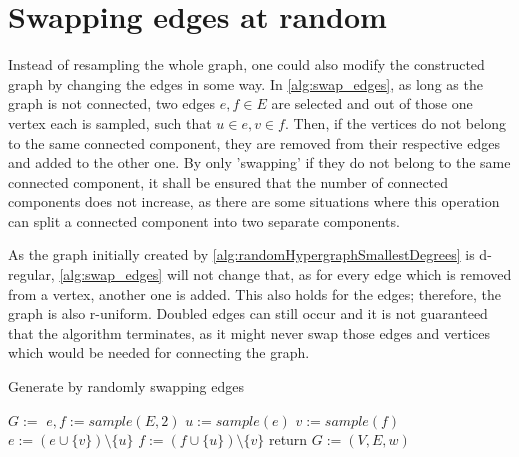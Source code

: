 \section{Swapping edges at random}
Instead of resampling the whole graph, one could also modify the constructed graph by changing the edges in some way. In \cref{alg:swap_edges}, as long as the graph is not connected, two edges $e,f \in E$ are selected and out of those one vertex each is sampled, such that $u\in e, v\in f$. Then, if the vertices do not belong to the same connected component, they are removed from their respective edges and added to the other one. By only 'swapping' if they do not belong to the same connected component, it shall be ensured that the number of connected components does not increase, as there are some situations where this operation can split a connected component into two separate components.

As the graph initially created by \cref{alg:randomHypergraphSmallestDegrees} is d-regular, \cref{alg:swap_edges} will not change that, as for every edge which is removed from a vertex, another one is added. This also holds for the edges; therefore, the graph is also r-uniform. Doubled edges can still occur and it is not guaranteed that the algorithm terminates, as it might never swap those edges and vertices which would be needed for connecting the graph.





	
\begin{algorithm}%
		\caption{Generate by randomly swapping edges \label{alg:swap_edges}} 
		\begin{algorithmic}
			\State $G:=$ 
			\State $e,f := sample(E, 2)$
			\State $u := sample(e)$
			\State $v := sample(f)$
			\State $e := (e \cup \{v\}) \setminus \{u\}$
			\State $f := (f \cup \{u\}) \setminus \{v\}$
			\EndIf
			\EndWhile
			\State return $G:=(V,E, w)$	
			\EndFunction 
		\end{algorithmic}
	\end{algorithm}	
	
	
	
